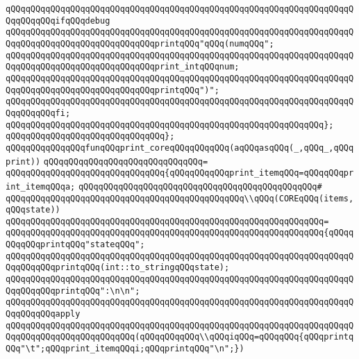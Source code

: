\newline
\verb|qQQqqQQqqQQqqQQqqQQqqQQqqQQqqQQqqQQqqQQqqQQqqQQqqQQqqQQqqQQqqQQqqQQqqQQqqQQqqQQqifqQQqdebug|\newline
\verb|qQQqqQQqqQQqqQQqqQQqqQQqqQQqqQQqqQQqqQQqqQQqqQQqqQQqqQQqqQQqqQQqqQQqqQQqqQQqqQQqqQQqqQQqqQQqqQQqqQQqprintqQQq"qQQq(numqQQq";|\newline
\verb|qQQqqQQqqQQqqQQqqQQqqQQqqQQqqQQqqQQqqQQqqQQqqQQqqQQqqQQqqQQqqQQqqQQqqQQqqQQqqQQqqQQqqQQqqQQqqQQqqQQqprint_intqQQqnum;|\newline
\verb|qQQqqQQqqQQqqQQqqQQqqQQqqQQqqQQqqQQqqQQqqQQqqQQqqQQqqQQqqQQqqQQqqQQqqQQqqQQqqQQqqQQqqQQqqQQqqQQqqQQqprintqQQq")";|\newline
\verb|qQQqqQQqqQQqqQQqqQQqqQQqqQQqqQQqqQQqqQQqqQQqqQQqqQQqqQQqqQQqqQQqqQQqqQQqqQQqqQQqfi;|\newline
\verb|qQQqqQQqqQQqqQQqqQQqqQQqqQQqqQQqqQQqqQQqqQQqqQQqqQQqqQQqqQQqqQQq};|\newline
\verb|qQQqqQQqqQQqqQQqqQQqqQQqqQQqqQQq};|\newline
\newline
\verb|qQQqqQQqqQQqqQQqfunqQQqprint_coreqQQqqQQqqQQq(aqQQqasqQQq(_,qQQq_,qQQqprint))|\newline
\verb|qQQqqQQqqQQqqQQqqQQqqQQqqQQqqQQq=|\newline
\verb|qQQqqQQqqQQqqQQqqQQqqQQqqQQqqQQq{qQQqqQQqqQQqprint_itemqQQq=qQQqqQQqprint_itemqQQqa;|\newline
\verb|qQQqqQQqqQQqqQQqqQQqqQQqqQQqqQQqqQQqqQQqqQQqqQQq#|\newline
\verb|qQQqqQQqqQQqqQQqqQQqqQQqqQQqqQQqqQQqqQQqqQQqqQQq\\qQQq(COREqQQq(items,qQQqstate))|\newline
\verb|qQQqqQQqqQQqqQQqqQQqqQQqqQQqqQQqqQQqqQQqqQQqqQQqqQQqqQQqqQQqqQQq=|\newline
\verb|qQQqqQQqqQQqqQQqqQQqqQQqqQQqqQQqqQQqqQQqqQQqqQQqqQQqqQQqqQQqqQQq{qQQqqQQqqQQqprintqQQq"stateqQQq";|\newline
\verb|qQQqqQQqqQQqqQQqqQQqqQQqqQQqqQQqqQQqqQQqqQQqqQQqqQQqqQQqqQQqqQQqqQQqqQQqqQQqqQQqprintqQQq(int::to_stringqQQqstate);|\newline
\verb|qQQqqQQqqQQqqQQqqQQqqQQqqQQqqQQqqQQqqQQqqQQqqQQqqQQqqQQqqQQqqQQqqQQqqQQqqQQqqQQqprintqQQq":\n\n";|\newline
\newline
\verb|qQQqqQQqqQQqqQQqqQQqqQQqqQQqqQQqqQQqqQQqqQQqqQQqqQQqqQQqqQQqqQQqqQQqqQQqqQQqqQQqapply|\newline
\verb|qQQqqQQqqQQqqQQqqQQqqQQqqQQqqQQqqQQqqQQqqQQqqQQqqQQqqQQqqQQqqQQqqQQqqQQqqQQqqQQqqQQqqQQqqQQqqQQq(qQQqqQQqqQQq\\qQQqiqQQq=qQQqqQQq{qQQqprintqQQq"\t";qQQqprint_itemqQQqi;qQQqprintqQQq"\n";})|\newline
